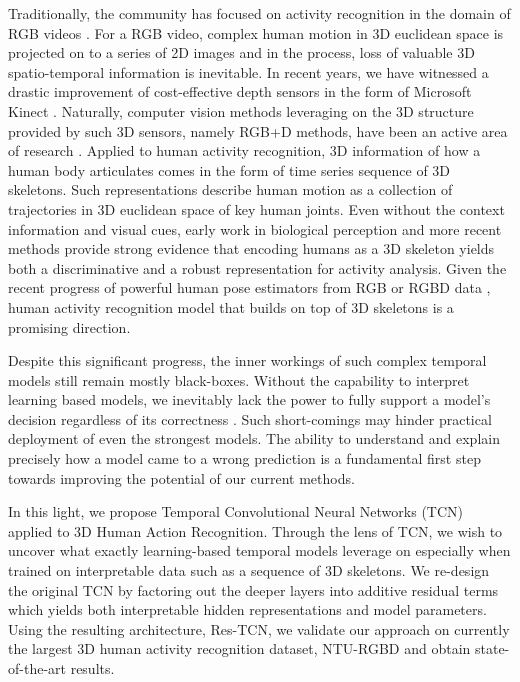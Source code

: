 \documentclass[10pt,twocolumn,letterpaper]{article}
\begin{document}
Traditionally, the community has focused on activity recognition in the domain of RGB videos \cite{survey2008,survey2016}. For a RGB video, complex human motion in 3D euclidean space is projected on to a series of 2D images and in the process, loss of valuable 3D spatio-temporal information is inevitable. In recent years, we have witnessed a drastic improvement of cost-effective depth sensors in the form of Microsoft Kinect \cite{kinect_review2013}. Naturally, computer vision methods leveraging on the 3D structure provided by such 3D sensors, namely RGB+D methods, have been an active area of research \cite{skeleton_review_2017}. Applied to human activity recognition, 3D information of how a human body articulates comes in the form of time series sequence of 3D skeletons. Such representations describe human motion as a collection of trajectories in 3D euclidean space of key human joints. Even without the context information and visual cues, early work \cite{Johansson1973} in biological perception and more recent methods \cite{skeleton_review_2017,kinect_review2013,Song2017} provide strong evidence that encoding humans as a 3D skeleton yields both a discriminative and a robust representation for activity analysis. Given the recent progress of powerful human pose estimators from RGB or RGBD data \cite{pose_estimation_2016}, human activity recognition model that builds on top of 3D skeletons is a promising direction.

Despite this significant progress, the inner workings of such complex temporal models still remain mostly black-boxes. Without the capability to interpret learning based models, we inevitably lack the power to fully support a model's decision regardless of its correctness \cite{mythos,trust2016}. Such short-comings may hinder practical deployment of even the strongest models. The ability to understand and explain precisely how a model came to a wrong prediction is a fundamental first step towards improving the potential of our current methods.

In this light, we propose Temporal Convolutional Neural Networks (TCN) \cite{TCN} applied to 3D Human Action Recognition. Through the lens of TCN, we wish to uncover what exactly learning-based temporal models leverage on especially when trained on interpretable data such as a sequence of 3D skeletons. We re-design the original TCN by factoring out the deeper layers into additive residual terms which yields both interpretable hidden representations and model parameters. Using the resulting architecture, Res-TCN, we validate our approach on currently the largest 3D human activity recognition dataset, NTU-RGBD and obtain state-of-the-art results.
\end{document}
